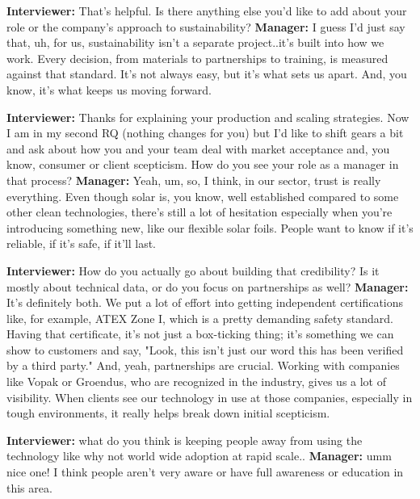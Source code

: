 \textbf{Interviewer:} That's helpful. Is there anything else you'd like to add about your role or the company's approach to sustainability? \newline
\textbf{Manager:} I guess I'd just say that, uh, for us, sustainability isn't a separate project..it's built into how we work. Every decision, from materials to partnerships to training, is measured against that standard. It's not always easy, but it's what sets us apart. And, you know, it's what keeps us moving forward. \newline

\textbf{Interviewer:} Thanks for explaining your production and scaling strategies. Now I am in my second RQ (nothing changes for you) but I'd like to shift gears a bit and ask about how you and your team deal with market acceptance and, you know, consumer or client scepticism. How do you see your role as a manager in that process? \newline
\textbf{Manager:} Yeah, um, so, I think, in our sector, trust is really everything. Even though solar is, you know, well established compared to some other clean technologies, there's still a lot of hesitation especially when you're introducing something new, like our flexible solar foils. People want to know if it's reliable, if it's safe, if it'll last. 

\textbf{Interviewer:} How do you actually go about building that credibility? Is it mostly about technical data, or do you focus on partnerships as well? \newline
\textbf{Manager:} It's definitely both. We put a lot of effort into getting independent certifications like, for example, ATEX Zone I, which is a pretty demanding safety standard. Having that certificate, it's not just a box-ticking thing; it's something we can show to customers and say, "Look, this isn't just our word this has been verified by a third party." And, yeah, partnerships are crucial. Working with companies like Vopak or Groendus, who are recognized in the industry, gives us a lot of visibility. When clients see our technology in use at those companies, especially in tough environments, it really helps break down initial scepticism. \newline

\textbf{Interviewer:} what do you think is keeping people away from using the technology like why not world wide adoption at rapid scale..  \newline
\textbf{Manager:} umm nice one! I think people aren't very aware or have full awareness or education in this area.  \newline

